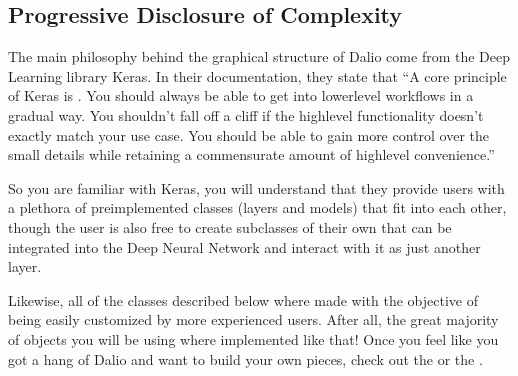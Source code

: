 \documentclass[letterpaper,10pt,english]{sphinxmanual}
\begin{document}
\subsection{Progressive Disclosure of Complexity}
\label{\detokenize{beginners-guide:progressive-disclosure-of-complexity}}
The main philosophy behind the graphical structure of Dal\sphinxhyphen{}io come from the Deep Learning library Keras. In their documentation, they state that “A core principle of Keras is . You should always be able to get into lower\sphinxhyphen{}level workflows in a gradual way. You shouldn’t fall off a cliff if the high\sphinxhyphen{}level functionality doesn’t exactly match your use case. You should be able to gain more control over the small details while retaining a commensurate amount of high\sphinxhyphen{}level convenience.”

So you are familiar with Keras, you will understand that they provide users with a plethora of pre\sphinxhyphen{}implemented classes (layers and models) that fit into each other, though the user is also free to create subclasses of their own that can be integrated into the Deep Neural Network and interact with it as just another layer.

Likewise, all of the classes described below where made with the objective of being easily customized by more experienced users. After all, the great majority of objects you will be using where implemented like that! Once you feel like you got a hang of Dal\sphinxhyphen{}io and want to build your own pieces, check out the  or the {\hyperref[\detokenize{developers-guide:developers-guide}]{}}.
\end{document}
